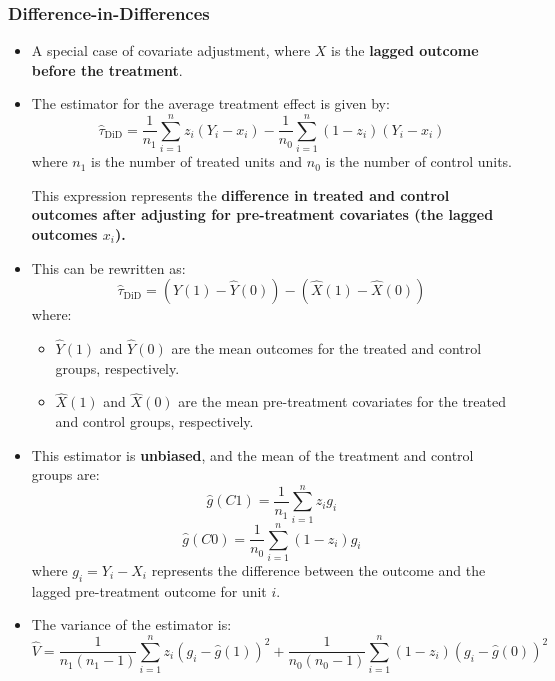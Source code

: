 \subsubsection{Difference-in-Differences}

\begin{itemize}
    \item A special case of covariate adjustment, where $X$ is the \textbf{lagged outcome before the treatment}.
    
    \item The estimator for the average treatment effect is given by:
    \[
    \hat{\tau}_{\text{DiD}} = \frac{1}{n_{1}} \sum_{i=1}^{n} z_i (Y_{i} - x_i) - \frac{1}{n_{0}} \sum_{i=1}^{n} (1 - z_i)(Y_{i} - x_i)
    \]
    where $n_{1}$ is the number of treated units and $n_{0}$ is the number of control units. 
    
    This expression represents the \textbf{difference in treated and control outcomes after adjusting for pre-treatment covariates (the lagged outcomes $x_i$).}
    
    \item This can be rewritten as:
    \[
    \hat{\tau}_{\text{DiD}} = \left( \hat{Y}(1) - \hat{Y}(0) \right) - \left( \hat{X}(1) - \hat{X}(0) \right)
    \]
    where:
    \begin{itemize}
        \item $\hat{Y}(1)$ and $\hat{Y}(0)$ are the mean outcomes for the treated and control groups, respectively.
        \item $\hat{X}(1)$ and $\hat{X}(0)$ are the mean pre-treatment covariates for the treated and control groups, respectively.
    \end{itemize}
    
    \item This estimator is \textbf{unbiased}, and the mean of the treatment and control groups are:
    \[
    \hat{g}(C1) = \frac{1}{n_{1}} \sum_{i=1}^{n} z_i g_i
    \]
    \[
    \hat{g}(C0) = \frac{1}{n_{0}} \sum_{i=1}^{n} (1 - z_i) g_i
    \]
    where $g_i = Y_i - X_i$ represents the difference between the outcome and the lagged pre-treatment outcome for unit $i$.
    
    \item The variance of the estimator is:
    \[
    \hat{V} = \frac{1}{n_{1}(n_{1} - 1)} \sum_{i=1}^{n} z_i \left( g_i - \hat{g}(1) \right)^2 + \frac{1}{n_{0}(n_{0} - 1)} \sum_{i=1}^{n} (1 - z_i) \left( g_i - \hat{g}(0) \right)^2
    \]
    
\end{itemize}

